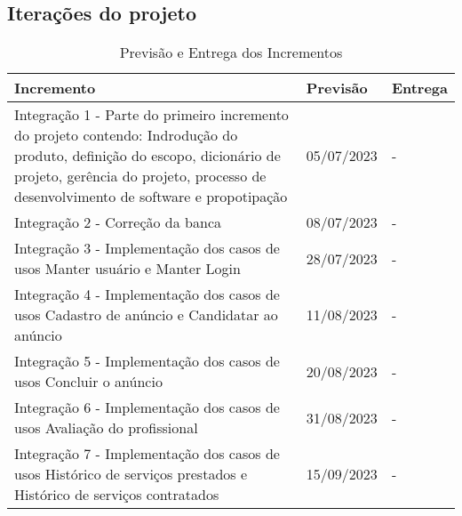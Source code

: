 \subsection{Iterações do projeto}

\begin{table}[htb]
    \centering
    \caption{Previsão e Entrega dos Incrementos}
    \label{tab:previsao-entrega-incrementos}
    \begin{tabular}{|p{8cm}|p{2cm}|p{2cm}|}
    \hline
    \textbf{Incremento} & \textbf{Previsão} & \textbf{Entrega}  \\ \hline
    Integração 1 - Parte do primeiro incremento do projeto contendo: Indrodução do produto, definição do escopo, dicionário de projeto, gerência do projeto, processo de desenvolvimento de software e propotipação & 05/07/2023 & -  \\ \hline
    Integração 2 - Correção da banca & 08/07/2023 & - \\ \hline
    Integração 3 - Implementação dos casos de usos Manter usuário e Manter Login & 28/07/2023 & - \\ \hline
    Integração 4 - Implementação dos casos de usos Cadastro de anúncio e Candidatar ao anúncio & 11/08/2023 & - \\ \hline
    Integração 5 - Implementação dos casos de usos Concluir o anúncio & 20/08/2023 & - \\ \hline
    Integração 6 - Implementação dos casos de usos Avaliação do profissional & 31/08/2023 & - \\ \hline
    Integração 7 - Implementação dos casos de usos Histórico de serviços prestados e Histórico de serviços contratados & 15/09/2023 & - \\ \hline
    \end{tabular}
\end{table}
    
    
    